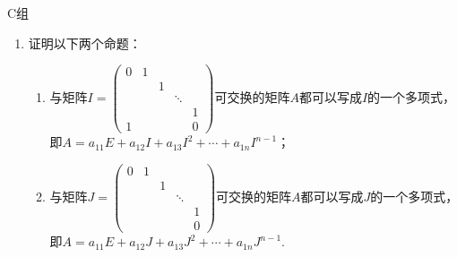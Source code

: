 \centerline{\heiti C组}
\begin{enumerate}
    \item 证明以下两个命题：
          \begin{enumerate}
              \item 与矩阵$I=\begin{pmatrix}
                            0 & 1 &   &        &   \\
                              &   & 1 &        &   \\
                              &   &   & \ddots &   \\
                              &   &   &        & 1 \\
                            1 &   &   &        & 0
                        \end{pmatrix}$可交换的矩阵$A$都可以写成$I$的一个多项式，即$A=a_{11}E+a_{12}I+a_{13}I^2+\cdots+a_{1n}I^{n-1}$；

              \item 与矩阵$J=\begin{pmatrix}
                            0 & 1 &   &        &   \\
                              &   & 1 &        &   \\
                              &   &   & \ddots &   \\
                              &   &   &        & 1 \\
                              &   &   &        & 0
                        \end{pmatrix}$可交换的矩阵$A$都可以写成$J$的一个多项式，即$A=a_{11}E+a_{12}J+a_{13}J^2+\cdots+a_{1n}J^{n-1}$.
          \end{enumerate}
\end{enumerate}
